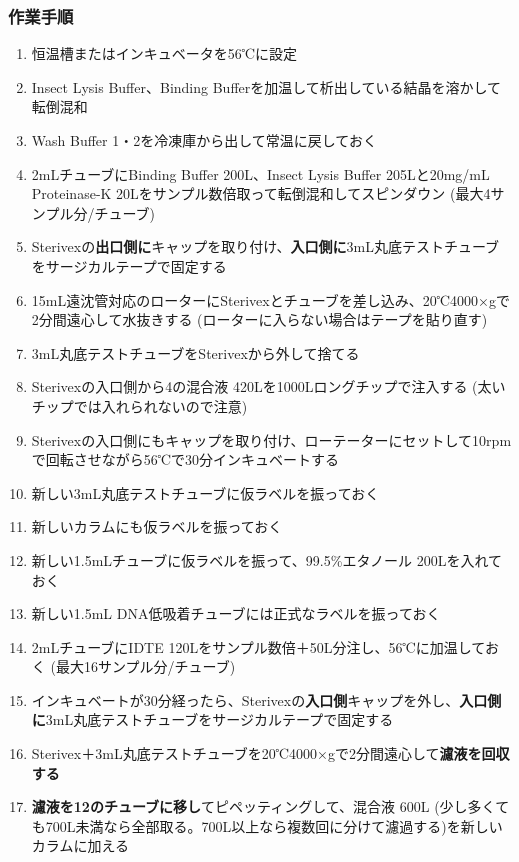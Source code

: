 \documentclass[titlepage,10pt,a4paper,uplatex]{jsbook}
\renewcommand{\textbf}[1]{{\bfseries\sffamily#1}}
\begin{document}
\subsubsection{作業手順}
\begin{enumerate}
\item 恒温槽またはインキュベータを56℃に設定
\item Insect Lysis Buffer、Binding Bufferを加温して析出している結晶を溶かして転倒混和
\item Wash Buffer 1・2を冷凍庫から出して常温に戻しておく
\item 2mLチューブにBinding Buffer 200{\textmu}L、Insect Lysis Buffer 205{\textmu}Lと20mg/mL Proteinase-K 20{\textmu}Lをサンプル数倍取って転倒混和してスピンダウン (最大4サンプル分/チューブ)
\item Sterivexの\textbf{出口側に}キャップを取り付け、\textbf{入口側に}3mL丸底テストチューブをサージカルテープで固定する
\item 15mL遠沈管対応のローターにSterivexとチューブを差し込み、20℃4000×gで2分間遠心して水抜きする (ローターに入らない場合はテープを貼り直す)
\item 3mL丸底テストチューブをSterivexから外して捨てる
\item Sterivexの入口側から4の混合液 420{\textmu}Lを1000{\textmu}Lロングチップで注入する (太いチップでは入れられないので注意)
\item Sterivexの入口側にもキャップを取り付け、ローテーターにセットして10rpmで回転させながら56℃で30分インキュベートする
\item 新しい3mL丸底テストチューブに仮ラベルを振っておく
\item 新しいカラムにも仮ラベルを振っておく
\item 新しい1.5mLチューブに仮ラベルを振って、99.5\%エタノール 200{\textmu}Lを入れておく
\item 新しい1.5mL DNA低吸着チューブには正式なラベルを振っておく
\item 2mLチューブにIDTE 120{\textmu}Lをサンプル数倍＋50{\textmu}L分注し、56℃に加温しておく (最大16サンプル分/チューブ)
\item インキュベートが30分経ったら、Sterivexの\textbf{入口側}キャップを外し、\textbf{入口側に}3mL丸底テストチューブをサージカルテープで固定する
\item Sterivex＋3mL丸底テストチューブを20℃4000×gで2分間遠心して\textbf{濾液を回収する}
\item \textbf{濾液を12のチューブに移し}てピペッティングして、混合液 600{\textmu}L (少し多くても700{\textmu}L未満なら全部取る。700{\textmu}L以上なら複数回に分けて濾過する)を新しいカラムに加える

\end{enumerate}
\end{document}
